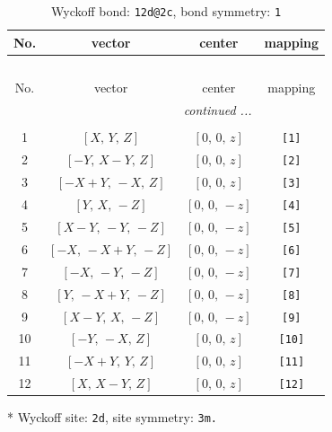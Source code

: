\documentclass[fleqn,8pt]{jsarticle}
\begin{document}
\begin{longtable}{cccc}
\caption{Wyckoff bond: {\tt 12d@2c}, bond symmetry: {\tt 1}}
 \\
 \hline \hline
No. & vector & center & mapping \\ \hline \endfirsthead

\multicolumn{3}{l}{\tablename\ \thetable{}} \\
 \hline \hline
No. & vector & center & mapping \\ \hline \endhead

 \hline \hline
\multicolumn{3}{r}{\footnotesize\it continued ...} \\ \endfoot

 \hline \hline
\multicolumn{3}{r}{} \\ \endlastfoot

1 & $\left[ X,\, Y,\, Z \right]$ & $\left[ 0,\, 0,\, z \right]$ & {\tt [1]} \\ \hline
2 & $\left[ - Y,\, X - Y,\, Z \right]$ & $\left[ 0,\, 0,\, z \right]$ & {\tt [2]} \\ \hline
3 & $\left[ - X + Y,\, - X,\, Z \right]$ & $\left[ 0,\, 0,\, z \right]$ & {\tt [3]} \\ \hline
4 & $\left[ Y,\, X,\, - Z \right]$ & $\left[ 0,\, 0,\, - z \right]$ & {\tt [4]} \\ \hline
5 & $\left[ X - Y,\, - Y,\, - Z \right]$ & $\left[ 0,\, 0,\, - z \right]$ & {\tt [5]} \\ \hline
6 & $\left[ - X,\, - X + Y,\, - Z \right]$ & $\left[ 0,\, 0,\, - z \right]$ & {\tt [6]} \\ \hline
7 & $\left[ - X,\, - Y,\, - Z \right]$ & $\left[ 0,\, 0,\, - z \right]$ & {\tt [7]} \\ \hline
8 & $\left[ Y,\, - X + Y,\, - Z \right]$ & $\left[ 0,\, 0,\, - z \right]$ & {\tt [8]} \\ \hline
9 & $\left[ X - Y,\, X,\, - Z \right]$ & $\left[ 0,\, 0,\, - z \right]$ & {\tt [9]} \\ \hline
10 & $\left[ - Y,\, - X,\, Z \right]$ & $\left[ 0,\, 0,\, z \right]$ & {\tt [10]} \\ \hline
11 & $\left[ - X + Y,\, Y,\, Z \right]$ & $\left[ 0,\, 0,\, z \right]$ & {\tt [11]} \\ \hline
12 & $\left[ X,\, X - Y,\, Z \right]$ & $\left[ 0,\, 0,\, z \right]$ & {\tt [12]} \\
\end{longtable}
* Wyckoff site: {\tt 2d}, site symmetry: {\tt 3m.}
\renewcommand{\arraystretch}{1.2}
\end{document}
